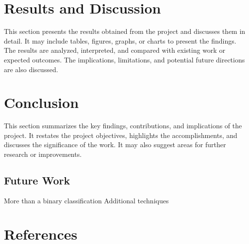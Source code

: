 \documentclass[journal]{IEEEtran}
\begin{document}



	\section{Results and Discussion}
	\label{sec:results_discussion}
	This section presents the results obtained from the project and discusses them in detail. It may include tables, figures, graphs, or charts to present the findings. The results are analyzed, interpreted, and compared with existing work or expected outcomes. The implications, limitations, and potential future directions are also discussed.
	
	\section{Conclusion}
	\label{sec:conclusion}
	This section summarizes the key findings, contributions, and implications of the project. It restates the project objectives, highlights the accomplishments, and discusses the significance of the work. It may also suggest areas for further research or improvements.
	
	\subsection{Future Work}
	More than a binary classification
	Additional techniques
	
	\section*{References}
	\label{sec:references}
	
	
\end{document}
